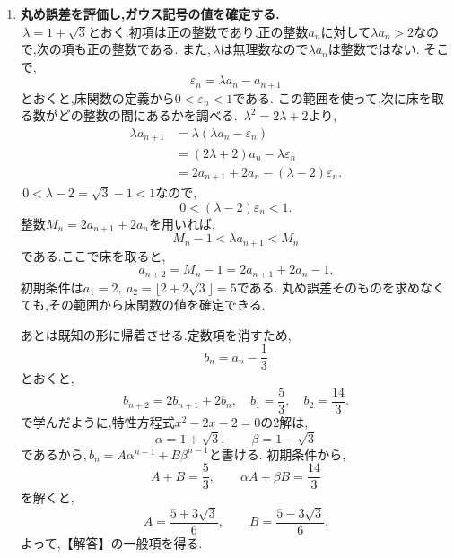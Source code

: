\begin{enumerate}[label=(\arabic*),parsep=3pt,format=\bookitemlink{example-gauss-integer-draft}{solution}{problem}]
      \item \textbf{丸め誤差を評価し,ガウス記号の値を確定する.}\\
            \,$\lambda=1+\sqrt3$とおく.初項は正の整数であり,正の整数$a_n$に対して$\lambda a_n>2$なので,次の項も正の整数である.
            また,\,$\lambda$は無理数なので$\lambda a_n$は整数ではない.
            そこで,
            \[
              \varepsilon_n=\lambda a_n-a_{n+1}
            \]
            とおくと,床関数の定義から$0<\varepsilon_n<1$である.
            この範囲を使って,次に床を取る数がどの整数の間にあるかを調べる.
            \,$\lambda^2=2\lambda+2$より,
            \begin{align*}
              \lambda a_{n+1}
                &=\lambda(\lambda a_n-\varepsilon_n)\\
                &=(2\lambda+2)a_n-\lambda\varepsilon_n\\
                &=2a_{n+1}+2a_n-(\lambda-2)\varepsilon_n.
            \end{align*}
            \,$0<\lambda-2=\sqrt3-1<1$なので,
            \[
              0<(\lambda-2)\varepsilon_n<1.
            \]
            整数$M_n=2a_{n+1}+2a_n$を用いれば,
            \[
              M_n-1<\lambda a_{n+1}<M_n
            \]
            である.ここで床を取ると,
            \[
              a_{n+2}=M_n-1=2a_{n+1}+2a_n-1.
            \]
            初期条件は$a_1=2,\ a_2=\lfloor2+2\sqrt3\rfloor=5$である.
            丸め誤差そのものを求めなくても,その範囲から床関数の値を確定できる.

            あとは既知の形に帰着させる.定数項を消すため,
            \[
              b_n=a_n-\frac13
            \]
            とおくと,
            \[
              b_{n+2}=2b_{n+1}+2b_n,
              \quad b_1=\frac53,\quad b_2=\frac{14}3.
            \]
            で学んだように,特性方程式$x^2-2x-2=0$の2解は,
            \[
              \alpha=1+\sqrt3,\qquad\beta=1-\sqrt3
            \]
            であるから,\,$b_n=A\alpha^{n-1}+B\beta^{n-1}$と書ける.
            初期条件から,
            \[
              A+B=\frac53,\qquad
              \alpha A+\beta B=\frac{14}3
            \]
            を解くと,
            \[
              A=\frac{5+3\sqrt3}{6},\qquad
              B=\frac{5-3\sqrt3}{6}.
            \]
            よって,【解答】の一般項を得る.


\end{enumerate}
